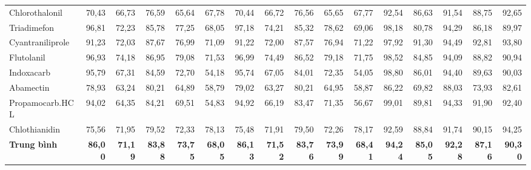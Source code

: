 \documentclass[10pt,twocolumn,twoside]{article}
\begin{document}
\begin{table}[htbp]
{\begin{tabular}{|l|rrrrr|rrrrr|rrrrr|}
Chlorothalonil & 70,43 & 66,73 & 76,59 & 65,64 & 67,78 & 70,44 & 66,72 & 76,56 & 65,65 & 67,77 & 92,54 & 86,63 & 91,54 & 88,75 & 92,65 \\
Triadimefon & 96,81 & 72,23 & 85,78 & 77,25 & 68,05 & 97,18 & 74,21 & 85,32 & 78,62 & 69,06 & 98,18 & 80,78 & 94,29 & 86,18 & 89,97 \\
Cyantraniliprole & 91,23 & 72,03 & 87,67 & 76,99 & 71,09 & 91,22 & 72,00 & 87,57 & 76,94 & 71,22 & 97,92 & 91,30 & 94,49 & 92,81 & 93,80 \\
Flutolanil & 96,93 & 74,18 & 86,95 & 79,08 & 71,53 & 96,99 & 74,49 & 86,52 & 79,18 & 71,75 & 98,52 & 84,85 & 94,09 & 88,82 & 90,94 \\
Indoxacarb & 95,79 & 67,31 & 84,59 & 72,70 & 54,18 & 95,74 & 67,05 & 84,01 & 72,35 & 54,05 & 98,80 & 86,01 & 94,40 & 89,63 & 90,03 \\
Abamectin & 78,93 & 63,24 & 80,21 & 64,89 & 58,79 & 79,02 & 63,27 & 80,21 & 64,95 & 58,87 & 86,22 & 69,82 & 88,03 & 73,93 & 82,61 \\
Propamocarb.HCL & 94,02 & 64,35 & 84,21 & 69,51 & 54,83 & 94,92 & 66,19 & 83,47 & 71,35 & 56,67 & 99,01 & 89,81 & 94,33 & 91,90 & 92,40 \\
Chlothianidin & 75,56 & 71,95 & 79,52 & 72,33 & 78,13 & 75,48 & 71,91 & 79,50 & 72,26 & 78,17 & 92,59 & 88,84 & 91,74 & 90,15 & 94,25 \\
\hline
\textbf{Trung bình} & \textbf{86,00} & \textbf{71,19} & \textbf{83,88} & \textbf{73,75} & \textbf{68,05} & \textbf{86,13} & \textbf{71,52} & \textbf{83,76} & \textbf{73,99} & \textbf{68,41} & \textbf{94,24} & \textbf{85,05} & \textbf{92,28} & \textbf{87,16} & \textbf{90,30} \\
\hline
\end{tabular}%
}
\end{table}
\end{document}

